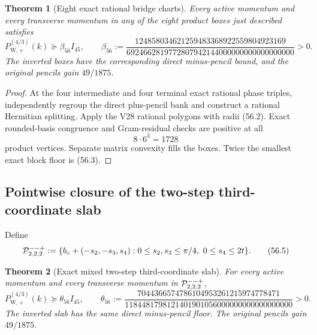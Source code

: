 \documentclass[11pt,oneside]{article}
\newtheorem{theorem}{Theorem}[section]
\theoremstyle{definition}
\theoremstyle{remark}
\begin{document}
\begin{theorem}[Eight exact rational bridge charts]
\label{thm:newv56-bridge-charts}
Every active momentum and every transverse momentum in any of the
eight product boxes just described satisfies
\[
 P_{\mathrm W,+}^{(4/3)}(k)
 \succeq\beta_{56}I_{45},\qquad
 \beta_{56}:=
 \frac{124858034621259483368922559804923169}
 {6924662819772807942144000000000000000000}>0.         \tag{56.3}
\]
The inverted boxes have the corresponding direct minus-pencil
bound, and the original pencils gain \(49/1875\).
\end{theorem}

\begin{proof}
At the four intermediate and four terminal exact rational phase
triples, independently regroup the direct plus-pencil bank and
construct a rational Hermitian splitting.  Apply the V28 rational
polygons with radii (56.2).  Exact rounded-basis congruence and
Gram-residual checks are positive at all
\[
 8\cdot6^3=1728                                       \tag{56.4}
\]
product vertices.  Separate matrix convexity fills the boxes.
Twice the smallest exact block floor is (56.3).
\end{proof}

\subsection{Pointwise closure of the two-step third-coordinate slab}

Define
\[
 {\cal P}_{2,2,2}^{--+}:=
 \{b_\circ+(-s_2,-s_3,s_4):
 0\le s_2,s_3\le\pi/4,\ 0\le s_4\le2t\}.             \tag{56.5}
\]

\begin{theorem}[Exact mixed two-step third-coordinate slab]
\label{thm:newv56-mixed-slab}
For every active momentum and every transverse momentum in
\({\cal P}_{2,2,2}^{--+}\),
\[
 P_{\mathrm W,+}^{(4/3)}(k)
 \succeq\theta_{56}I_{45},\qquad
 \theta_{56}:=
 \frac{7044366574786104953261215974778471}
 {1184481798121401901056000000000000000000}>0.         \tag{56.6}
\]
The inverted slab has the same direct minus-pencil floor.  The
original pencils gain \(49/1875\).
\end{theorem}
\end{document}
